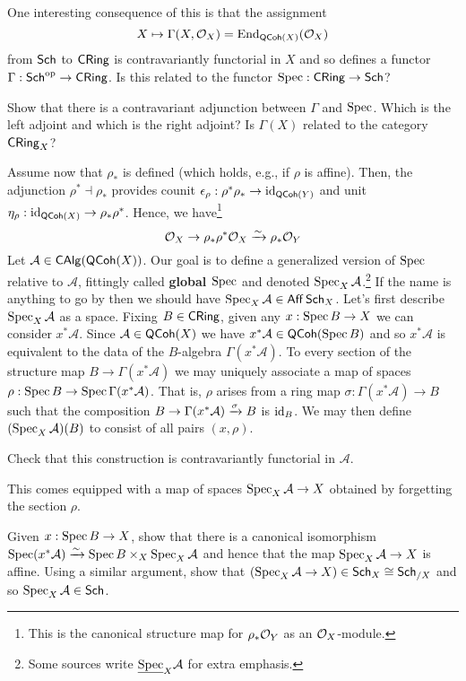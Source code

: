 \documentclass[11pt]{article}
\renewcommand{\AA}{\mathcal{A}}
\begin{document}
One interesting consequence of this is that the assignment 
$$X\mapsto\Gamma(X,\mathcal{O}_X)=\operatorname{End}_{\operatorname{\mathsf{QCoh}}(X)}(\mathcal{O}_X)$$
from $\operatorname{\mathsf{Sch}}$ to $\operatorname{\mathsf{CRing}}$ is contravariantly functorial in $X$ and so defines a functor $\Gamma: \operatorname{\mathsf{Sch}}^{\operatorname{op}}\to\operatorname{\mathsf{CRing}}$. Is this related to the functor $\operatorname{Spec}: \operatorname{\mathsf{CRing}}\to\operatorname{\mathsf{Sch}}$?

\begin{exercise}
Show that there is a contravariant adjunction between $\Gamma$ and $\operatorname{Spec}$. Which is the left adjoint and which is the right adjoint? Is $\Gamma(X)$ related to the category $\operatorname{\mathsf{CRing}}_X$?
\end{exercise}

Assume now that $\rho_*$ is defined (which holds, e.g., if $\rho$ is affine). Then, the adjunction $\rho^*\dashv\rho_*$ provides counit $\epsilon_{\rho}: \rho^*\rho_*\to\operatorname{id}_{\operatorname{\mathsf{QCoh}}(Y)}$ and unit $\eta_{\rho}: \operatorname{id}_{\operatorname{\mathsf{QCoh}}(X)}\to\rho_*\rho^*$. Hence, we have\footnote{This is the canonical structure map for $\rho_*\mathcal{O}_Y$ as an $\mathcal{O}_X$-module.} 
$$\mathcal{O}_X\to\rho_*\rho^*\mathcal{O}_X\xrightarrow{\sim}\rho_*\mathcal{O}_Y$$
Let $\AA\in\CAlg(\QCoh(X))$. Our goal is to define a generalized version of $\operatorname{Spec}$ relative to $\AA$, fittingly called \textbf{global $\operatorname{Spec}$} and denoted $\Spec_X\AA$.\footnote{Some sources write $\un{\Spec}_X\AA$ for extra emphasis.} If the name is anything to go by then we should have $\Spec_X\AA\in\Aff\Sch_X$. Let's first describe $\Spec_X\AA$ as a space. Fixing $B\in\operatorname{\mathsf{CRing}}$, given any $x: \operatorname{Spec} B\to X$ we can consider $x^*\AA$. Since $\AA\in\QCoh(X)$ we have $x^*\AA\in\QCoh(\Spec B)$ and so $x^*\AA$ is equivalent to the data of the $B$-algebra $\Gamma(x^*\AA)$. To every section of the structure map $B\to\Gamma(x^*\AA)$ we may uniquely associate a map of spaces $\rho: \Spec B\to\Spec\Gamma(x^*\AA)$. That is, $\rho$ arises from a ring map $\sigma: \Gamma(x^*\AA)\to B$ such that the composition $B\to\Gamma(x^*\AA)\xto{\sigma}B$ is $\operatorname{id}_B$. We may then define $(\Spec_X\AA)(B)$ to consist of all pairs $(x,\rho)$.

\begin{exercise}
Check that this construction is contravariantly functorial in $\AA$.
\end{exercise}

This comes equipped with a map of spaces $\Spec_X\AA\to X$ obtained by forgetting the section $\rho$.

\begin{exercise}
Given $x: \operatorname{Spec} B\to X$, show that there is a canonical isomorphism $\Spec(x^*\AA)\xto{\sim}\Spec B\times_X\Spec_X\AA$ and hence that the map $\Spec_X\AA\to X$ is affine. Using a similar argument, show that $(\Spec_X\AA\to X)\in\Sch_X\iso\Sch_{/X}$ and so $\Spec_X\AA\in\Sch$.
\end{exercise} 
\end{document}
